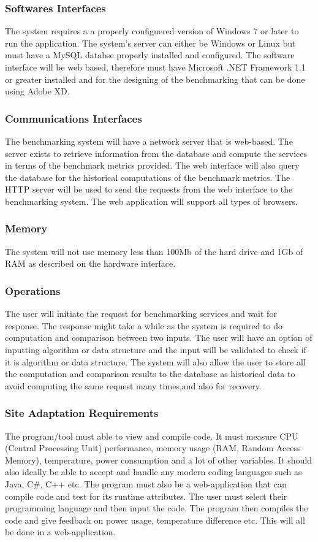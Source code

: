 \documentclass[a4paper,12pt]{article}
\begin{document}
\subsubsection{Softwares Interfaces}
The system requires a a properly configuered version of Windows 7 or later to run the application. The system's server can either be Windows or Linux but must have a MySQL databse properly installed and configured. The software interface will be web based, therefore must have Microsoft .NET Framework 1.1 or greater installed and for the designing of the benchmarking that can be done using Adobe XD.

\subsubsection{Communications Interfaces}
The benchmarking system will have a network server that is web-based. The server exists to retrieve information from the database
and compute the services in terms of the benchmark metrics provided. The web interface will also query the database for the historical computations of the benchmark metrics. The HTTP server will be used to send the requests from the web interface to
the benchmarking system. The web application will support all types of browsers.
\subsubsection{Memory}
The system will not use memory less than 100Mb of the hard drive and 1Gb of RAM as described on the hardware interface.
\subsubsection{Operations}
The user will initiate the request for benchmarking services and wait for response. The response might take a while as the system is required to do computation and comparison between two inputs. The user will have an option of inputting algorithm or data structure and the input will be validated to check if it is algorithm or data structure. The system will also allow the user to store all the computation and comparison results to the database as historical data to avoid computing the same request many times,and also for recovery. 
\subsubsection{Site Adaptation Requirements}
The program/tool must able to view and compile code. It must measure CPU (Central Processing Unit) performance, memory usage (RAM, Random Access Memory), temperature, power consumption and a lot of other variables.
It should also ideally be able to accept and handle any modern coding languages such as Java, C#, C++ etc. The program must also be a web-application that can compile code and test for its runtime attributes. 
The user must select their programming language and then input the code. The program then compiles the code and give feedback on power usage, temperature difference etc. This will all be done in a web-application.
\end{document}
